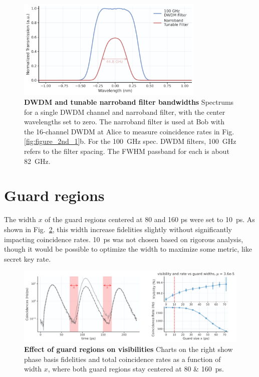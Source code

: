 \documentclass[11pt]{caltech_thesis} %
\begin{document}
\hypertarget{fig:bandwidths}{%
\begin{figure}[!htb]
\centering
\includegraphics[width=0.8\textwidth,height=\textheight]{./chapter_05/figs/filter_comparison_light.pdf}
\caption[{DWDM and tunable narroband filter bandwidths}]{\textbf{DWDM and tunable narroband filter bandwidths} Spectrums for a single DWDM channel and narroband filter, with the center wavelengths set to zero. The narroband filter is used at Bob with the 16-channel DWDM at Alice to measure coincidence rates in Fig. \ref{fig:figure_2nd_1}b. For the 100~GHz spec. DWDM filters, 100~GHz refers to the filter spacing. The FWHM passband for each is about 82~GHz.}
\label{fig:bandwidths}
\end{figure}
}

\hypertarget{guard-regions}{%
\section{Guard regions}\label{guard-regions}}

The width $x$ of the guard regions centered at 80 and 160 ps were set to 10~ps. As shown in Fig.~\ref{fig:guard_scan}, this width increase fidelities slightly without significantly impacting coincidence rates. 10~ps was not chosen based on rigorous analysis, though it would be possible to optimize the width to maximize some metric, like secret key rate.

\hypertarget{fig:guard_scan}{%
\begin{figure}
\centering
\includegraphics[width=1\textwidth,height=\textheight]{./chapter_05/figs/guard_scan_light.pdf}
\caption[{Effect of guard regions on visibilities}]{\textbf{Effect of guard regions on visibilities} Charts on the right show phase basis fidelities and total coincidence rates as a function of width $x$, where both guard regions stay centered at 80 \& 160~ps.}
\label{fig:guard_scan}
\end{figure}
}
\end{document}
